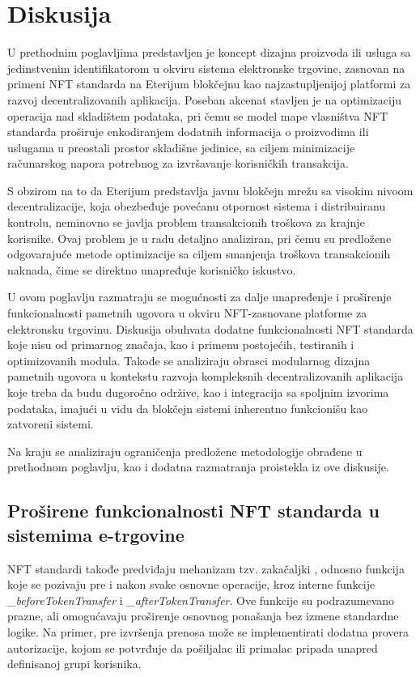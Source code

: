 \chapter{Diskusija}
U prethodnim poglavljima predstavljen je koncept dizajna proizvoda ili usluga sa jedinstvenim identifikatorom u okviru sistema elektronske trgovine, zasnovan na primeni NFT standarda na Eterijum blokčejnu kao najzastupljenijoj platformi za razvoj decentralizovanih aplikacija. Poseban akcenat stavljen je na optimizaciju operacija nad skladištem podataka, pri čemu se model mape vlasništva NFT standarda proširuje enkodiranjem dodatnih informacija o proizvodima ili uslugama u preostali prostor skladišne jedinice, sa ciljem minimizacije računarskog napora potrebnog za izvršavanje korisničkih transakcija.

S obzirom na to da Eterijum predstavlja javnu blokčejn mrežu sa visokim nivoom decentralizacije, koja obezbeđuje povećanu otpornost sistema i distribuiranu kontrolu, neminovno se javlja problem transakcionih troškova za krajnje korisnike. Ovaj problem je u radu detaljno analiziran, pri čemu su predložene odgovarajuće metode optimizacije sa ciljem smanjenja troškova transakcionih naknada, čime se direktno unapređuje korisničko iskustvo.

U ovom poglavlju razmatraju se mogućnosti za dalje unapređenje i proširenje funkcionalnosti pametnih ugovora u okviru NFT-zasnovane platforme za elektronsku trgovinu. Diskusija obuhvata dodatne funkcionalnosti NFT standarda koje nisu od primarnog značaja, kao i primenu postojećih, testiranih i optimizovanih modula. Takođe se analiziraju obrasci modularnog dizajna pametnih ugovora u kontekstu razvoja kompleksnih decentralizovanih aplikacija koje treba da budu dugoročno održive, kao i integracija sa spoljnim izvorima podataka, imajući u vidu da blokčejn sistemi inherentno funkcionišu kao zatvoreni sistemi.

Na kraju se analiziraju ograničenja predložene metodologije obrađene u prethodnom poglavlju, kao i dodatna razmatranja proistekla iz ove diskusije.

\section{Proširene funkcionalnosti NFT standarda u sistemima e-trgovine}
NFT standardi takođe predviđaju mehanizam tzv. zakačaljki , odnosno funkcija koje se pozivaju pre i nakon svake osnovne operacije, kroz interne funkcije \textit{\_beforeTokenTransfer} i \textit{\_afterTokenTransfer}. Ove funkcije su podrazumevano prazne, ali omogućavaju proširenje osnovnog ponašanja bez izmene standardne logike. Na primer, pre izvršenja prenosa može se implementirati dodatna provera autorizacije, kojom se potvrđuje da pošiljalac ili primalac pripada unapred definisanoj grupi korisnika.

